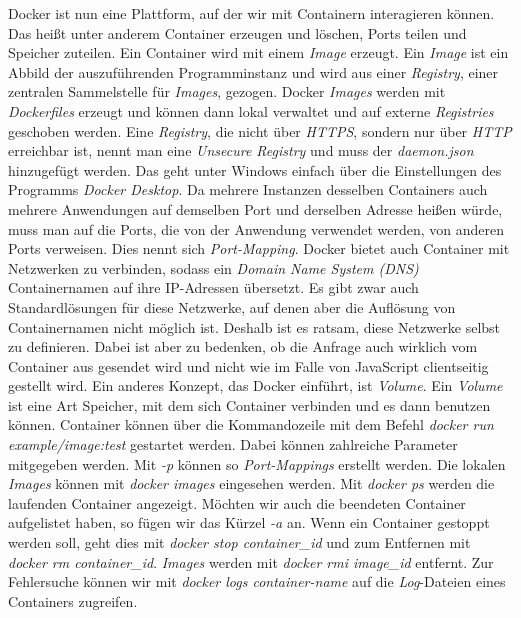 \documentclass[12pt,a4paper]{scrartcl}
\begin{document}
Docker ist nun eine Plattform, auf der wir mit Containern interagieren können. Das heißt unter anderem Container erzeugen und löschen, Ports teilen und Speicher zuteilen. Ein Container wird mit einem \emph{Image} erzeugt. Ein \emph{Image} ist ein Abbild der auszuführenden Programminstanz und wird aus einer \emph{Registry}, einer zentralen Sammelstelle für \emph{Images}, gezogen. Docker \emph{Images} werden mit \emph{Dockerfiles} erzeugt und können dann lokal verwaltet und auf externe \emph{Registries} geschoben werden. Eine \emph{Registry}, die nicht über \emph{HTTPS}, sondern nur über \emph{HTTP} erreichbar ist, nennt man eine \emph{Unsecure Registry} und muss der \emph{daemon.json} hinzugefügt werden. Das geht unter Windows einfach über die Einstellungen des Programms \emph{Docker Desktop}. Da mehrere Instanzen desselben Containers auch mehrere Anwendungen auf demselben Port und derselben Adresse heißen würde, muss man auf die Ports, die von der Anwendung verwendet werden, von anderen Ports verweisen. Dies nennt sich \emph{Port-Mapping}. 
Docker bietet auch Container mit Netzwerken zu verbinden, sodass ein \emph{Domain Name System (DNS)} Containernamen auf ihre IP-Adressen übersetzt. Es gibt zwar auch Standardlösungen für diese Netzwerke, auf denen aber die Auflösung von Containernamen nicht möglich ist. Deshalb ist es ratsam, diese Netzwerke selbst zu definieren.
Dabei ist aber zu bedenken, ob die Anfrage auch wirklich vom Container aus gesendet wird und nicht wie im Falle von JavaScript clientseitig gestellt wird.
Ein anderes Konzept, das Docker einführt, ist \emph{Volume}. Ein \emph{Volume} ist eine Art Speicher, mit dem sich Container verbinden und es dann benutzen können.
Container können über die Kommandozeile mit dem Befehl  \emph{docker run example/image:test} gestartet werden. Dabei können zahlreiche Parameter mitgegeben werden. Mit \emph{-p} können so \emph{Port-Mappings} erstellt werden. Die lokalen \emph{Images} können mit \emph{docker images} eingesehen werden. Mit \emph{docker ps} werden die laufenden Container angezeigt. Möchten wir auch die beendeten Container aufgelistet haben, so fügen wir das Kürzel \emph{-a} an. Wenn ein Container gestoppt werden soll, geht dies mit \emph{docker stop container\_id} und zum Entfernen mit \emph{docker rm container\_id}. \emph{Images} werden mit \emph{docker rmi image\_id} entfernt. Zur Fehlersuche können wir mit \emph{docker logs container-name} auf die \emph{Log}-Dateien eines Containers zugreifen.
\end{document}
